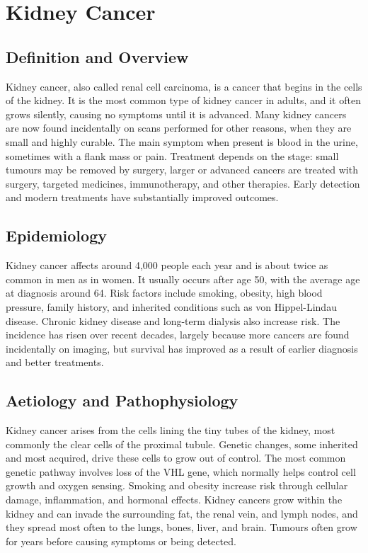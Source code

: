 \chapter{Kidney Cancer}

\section*{Definition and Overview}
Kidney cancer, also called renal cell carcinoma, is a cancer that begins in the cells of the kidney. It is the most common type of kidney cancer in adults, and it often grows silently, causing no symptoms until it is advanced. Many kidney cancers are now found incidentally on scans performed for other reasons, when they are small and highly curable. The main symptom when present is blood in the urine, sometimes with a flank mass or pain. Treatment depends on the stage: small tumours may be removed by surgery, larger or advanced cancers are treated with surgery, targeted medicines, immunotherapy, and other therapies. Early detection and modern treatments have substantially improved outcomes.

\section*{Epidemiology}
Kidney cancer affects around 4,000 people each year and is about twice as common in men as in women. It usually occurs after age 50, with the average age at diagnosis around 64. Risk factors include smoking, obesity, high blood pressure, family history, and inherited conditions such as von Hippel-Lindau disease. Chronic kidney disease and long-term dialysis also increase risk. The incidence has risen over recent decades, largely because more cancers are found incidentally on imaging, but survival has improved as a result of earlier diagnosis and better treatments.

\section*{Aetiology and Pathophysiology}
Kidney cancer arises from the cells lining the tiny tubes of the kidney, most commonly the clear cells of the proximal tubule. Genetic changes, some inherited and most acquired, drive these cells to grow out of control. The most common genetic pathway involves loss of the VHL gene, which normally helps control cell growth and oxygen sensing. Smoking and obesity increase risk through cellular damage, inflammation, and hormonal effects. Kidney cancers grow within the kidney and can invade the surrounding fat, the renal vein, and lymph nodes, and they spread most often to the lungs, bones, liver, and brain. Tumours often grow for years before causing symptoms or being detected.

